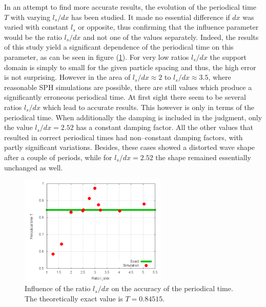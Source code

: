 \documentclass{report}
\begin{document}
In an attempt to find more accurate results, the evolution of the periodical time $T$ with varying $l_s/dx$ has been studied. It made no essential difference if $dx$ was varied with constant $l_s$ or opposite, thus confirming that the influence parameter would be the ratio $l_s/dx$ and not one of the values separately. Indeed, the results of this study yield a significant dependence of the periodical time on this parameter, as can be seen in figure (\ref{fig:Results_1DoscillatingWave_T_versus_ls/dx}). For very low ratios $l_s/dx$ the support domain is simply to small for the given particle spacing and thus, the high error is not surprising. However in the area of $l_s/dx\approx2$ to $l_s/dx\approx3.5$, where reasonable SPH simulations are possible, there are still values which produce a significantly erroneous periodical time. 
At first sight there seem to be several ratios $l_s/dx$ which lead to accurate results. This however is only in terms of the periodical time. When additionally the damping is included in the judgment, only the value $l_s/dx=2.52$ has a constant damping factor. All the other values that resulted in correct periodical times had non--constant damping factors, with partly significant variations. Besides, these cases showed a distorted wave shape %
after a couple of periods, while for $l_s/dx=2.52$ the shape remained essentially unchanged as well. 



\begin{figure}[h]
 \label{fig:Results_1DoscillatingWave_T_versus_ls/dx}
\centering

\includegraphics[width=7cm]{Graphics/results/1DWave/Oscillation/suplen_influence}

\caption[1D Oscillation: periodical time versus $l_s/dx$]{Influence of the ratio $l_s/dx$ on the accuracy of the periodical time. The theoretically exact value %
is $T=0.84515$. %
}

\end{figure}
\end{document}
